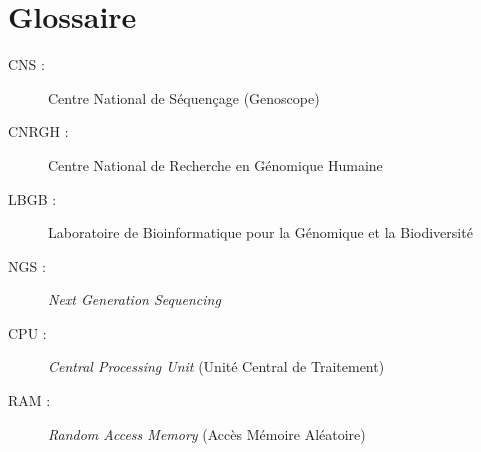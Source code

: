 \section*{Glossaire}

\begin{description}
    \item[CNS :] Centre National de Séquençage (Genoscope)
    \item[CNRGH :] Centre National de Recherche en Génomique Humaine 
    \item[LBGB :] Laboratoire de Bioinformatique pour la Génomique et la Biodiversité
    \item[NGS :] \emph{Next Generation Sequencing}
    \item[CPU :] \emph{Central Processing Unit} (Unité Central de Traitement)
    \item[RAM :] \emph{Random Access Memory} (Accès Mémoire Aléatoire)
\end{description}